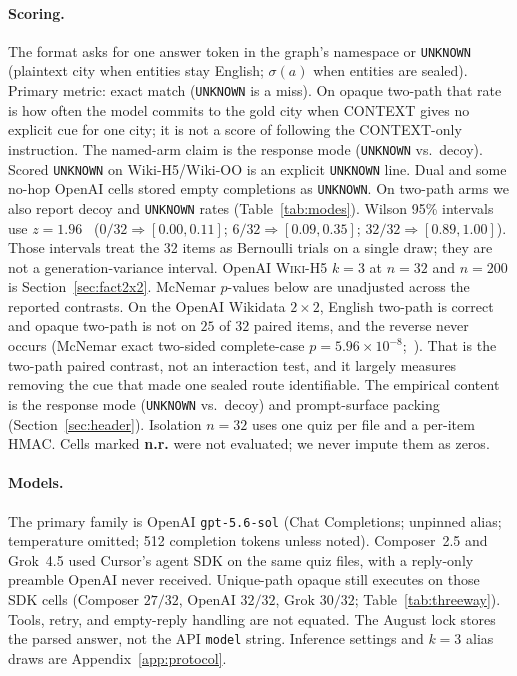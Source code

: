 \documentclass{article}
\begin{document}
\paragraph{Scoring.}
The format asks for one answer token in the graph's namespace or
\texttt{UNKNOWN} (plaintext city when entities stay English; $\sigma(a)$
when entities are sealed).
Primary metric: exact match (\texttt{UNKNOWN} is a miss).
On opaque two-path that rate is how often the model commits to the gold
city when CONTEXT gives no explicit cue for one city; it is not a score of
following the CONTEXT-only instruction.
The named-arm claim is the response mode (\texttt{UNKNOWN} vs.\ decoy).
Scored \texttt{UNKNOWN} on Wiki-H5/Wiki-OO is an explicit \texttt{UNKNOWN}
line. Dual and some no-hop OpenAI cells stored empty completions as
\texttt{UNKNOWN}. On two-path arms we also report decoy
and \texttt{UNKNOWN} rates (Table~\ref{tab:modes}).
Wilson 95\% intervals use $z{=}1.96$~\citep{wilson1927}
($0/32 \Rightarrow [0.00,0.11]$;
$6/32 \Rightarrow [0.09,0.35]$;
$32/32 \Rightarrow [0.89,1.00]$).
Those intervals treat the 32 items as Bernoulli trials on a single draw;
they are not a generation-variance interval. OpenAI \textsc{Wiki-H5} $k{=}3$
at $n{=}32$ and $n{=}200$ is Section~\ref{sec:fact2x2}.
McNemar $p$-values below are unadjusted across the reported contrasts.
On the OpenAI Wikidata $2{\times}2$, English two-path is correct and opaque
two-path is not on $25$ of $32$ paired items, and the reverse never occurs
(McNemar exact two-sided complete-case $p{=}5.96{\times}10^{-8}$;~\citealp{mcnemar1947}).
That is the two-path paired contrast, not an interaction test, and it
largely measures removing the cue that made one sealed route identifiable.
The empirical content is the response mode (\texttt{UNKNOWN} vs.\ decoy)
and prompt-surface packing (Section~\ref{sec:header}).
Isolation $n{=}32$ uses one quiz per file and a per-item HMAC. Cells marked
\textbf{n.r.} were not evaluated; we never impute them as zeros.

\paragraph{Models.}
The primary family is OpenAI \mbox{\texttt{gpt-5.6-sol}} (Chat Completions;
unpinned alias; temperature omitted; 512 completion tokens unless noted).
Composer~2.5 and Grok~4.5 used Cursor's agent SDK on the same quiz files,
with a reply-only preamble OpenAI never received.
Unique-path opaque still executes on those SDK cells (Composer $27/32$,
OpenAI $32/32$, Grok $30/32$; Table~\ref{tab:threeway}).
Tools, retry, and empty-reply handling are not equated.
The August lock stores the parsed answer, not the API \texttt{model}
string.
Inference settings and $k{=}3$ alias draws are Appendix~\ref{app:protocol}.
\end{document}
